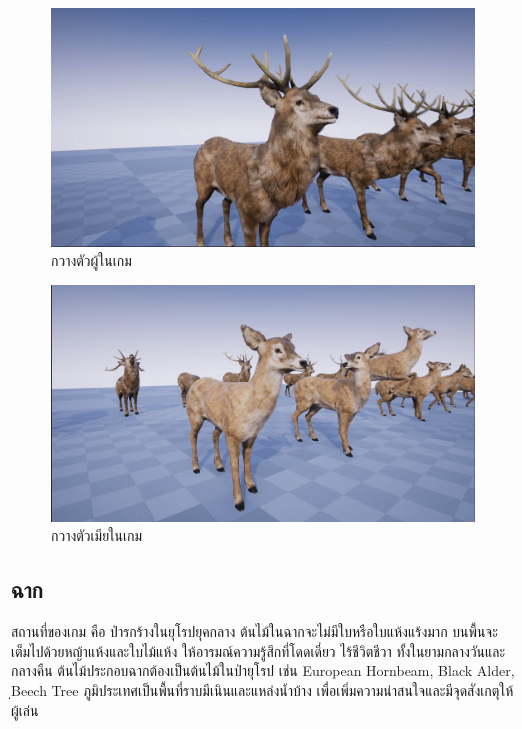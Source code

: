 \begin{figure}[h]
  \begin{center}
  \includegraphics[width=\textwidth]{./img/deerstag.png}
  \end{center}
  \caption[กวางตัวผู้ในเกม]{กวางตัวผู้ในเกม}
  \label{fig:deerstag}
\end{figure}

\begin{figure}[h]
  \begin{center}
  \includegraphics[width=\textwidth]{./img/deerdoe.png}
  \end{center}
  \caption[กวางตัวเมียในเกม]{กวางตัวเมียในเกม}
  \label{fig:deerdoe}
\end{figure}

\subsection{ฉาก}

สถานที่ของเกม คือ ป่ารกร้างในยุโรปยุคกลาง ต้นไม้ในฉากจะไม่มีใบหรือใบแห้งแร้งมาก บนพื้นจะเต็มไปด้วยหญ้าแห้งและใบไม้แห้ง ให้อารมณ์ความรู้สึกที่โดดเดี่ยว ไร้ชีวิตชีวา ทั้งในยามกลางวันและกลางคืน ต้นไม้ประกอบฉากต้องเป็นต้นไม้ในป่ายุโรป เช่น European Hornbeam, Black Alder, ฺBeech Tree ภูมิประเทศเป็นพื้นที่ราบมีเนินและแหล่งน้ำบ้าง เพื่อเพิ่มความน่าสนใจและมีจุดสังเกตุให้ผู้เล่น

